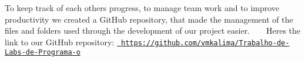 To keep track of each other\textquotesingle{}s progress, to manage team work and to improve productivity we created a Git\+Hub repository, that made the management of the files and folders used through the development of our project easier. ~\newline
 ~\newline
Here\textquotesingle{}s the link to our Git\+Hub repository\+: \href{https://github.com/vmkalima/Trabalho-de-Labs-de-Programa-o}{\texttt{ https\+://github.\+com/vmkalima/\+Trabalho-\/de-\/\+Labs-\/de-\/\+Programa-\/o}} 